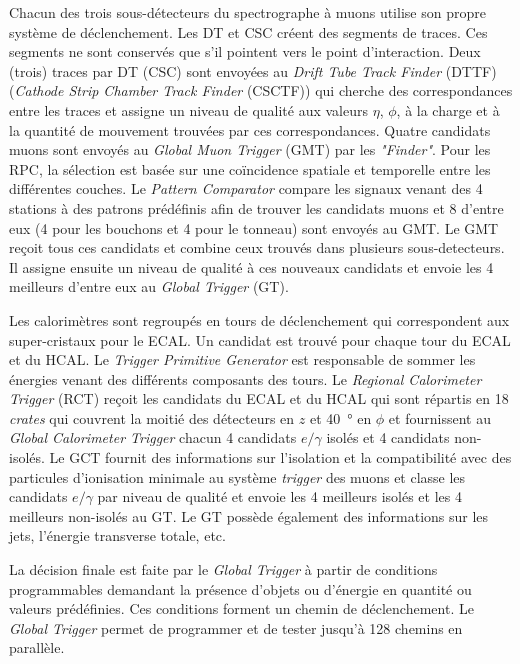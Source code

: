 Chacun des trois sous-détecteurs du spectrographe à muons utilise son propre système de déclenchement. Les DT et CSC créent des segments de traces. Ces segments ne sont conservés que s'il pointent vers le point d'interaction. Deux (trois) traces par DT (CSC) sont envoyées au \textit{Drift Tube Track Finder} (DTTF) (\textit{Cathode Strip Chamber Track Finder }(CSCTF)) qui cherche des correspondances entre les traces et assigne un niveau de qualité aux valeurs $\eta$, $\phi$, à la charge et à la quantité de mouvement trouvées par ces correspondances. Quatre candidats muons sont envoyés au \textit{Global Muon Trigger} (GMT) par les \textit{"Finder"}. Pour les RPC, la sélection est basée sur une coïncidence spatiale et temporelle entre les différentes couches. Le \textit{Pattern Comparator} compare les signaux venant des \num{4} stations à des patrons prédéfinis afin de trouver les candidats muons et \num{8} d'entre eux (\num{4} pour les bouchons et \num{4} pour le tonneau) sont envoyés au GMT. Le GMT reçoit tous ces candidats et combine ceux trouvés dans plusieurs sous-detecteurs. Il assigne ensuite un niveau de qualité à ces nouveaux candidats et envoie les \num{4} meilleurs d'entre eux au \textit{Global Trigger} (GT).

Les calorimètres sont regroupés en tours de déclenchement qui correspondent aux super-cristaux pour le ECAL. Un candidat est trouvé pour chaque tour du ECAL et du HCAL. Le \textit{Trigger Primitive Generator} est responsable de sommer les énergies venant des différents composants des tours.  Le \textit{Regional Calorimeter Trigger} (RCT) reçoit les candidats du ECAL et du HCAL qui sont répartis en \num{18} \textit{crates} qui couvrent la moitié des détecteurs en $z$ et \SI{40}{\degree} en $\phi$ et fournissent au \textit{Global Calorimeter Trigger} chacun \num{4} candidats $e/\gamma$ isolés et \num{4} candidats non-isolés. Le GCT fournit des informations sur l'isolation et la compatibilité avec des particules d'ionisation minimale au système \textit{trigger} des muons et classe les candidats $e/\gamma$ par niveau de qualité et envoie les \num{4} meilleurs isolés et les \num{4} meilleurs non-isolés au GT. Le GT possède également des informations sur les jets, l'énergie transverse totale, etc.

La décision finale est faite par le \textit{Global Trigger} à partir de conditions programmables demandant la présence d'objets ou d'énergie en quantité ou valeurs prédéfinies. Ces conditions forment un chemin de déclenchement. Le \textit{Global Trigger} permet de programmer et de tester jusqu'à \num{128} chemins en parallèle. 

